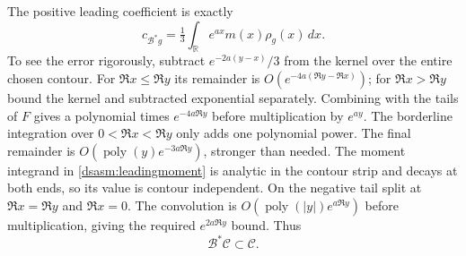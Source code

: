 \documentclass[11pt,letterpaper]{article}
\theoremstyle{remark}\newtheorem{remark}[theorem]{Remark}
\newcommand{\R}{\mathbb R}\newcommand{\C}{\mathbb C}\newcommand{\N}{\mathbb N}
\begin{document}
The positive leading coefficient is exactly
\begin{equation}\label{dsasm:leadingmoment}
 c_{\mathcal B^*g}=\tfrac13\int_\R e^{ax}m(x)\rho_g(x)\,dx.
\end{equation}
To see the error rigorously, subtract $e^{-2a(y-x)}/3$ from the
kernel over the entire chosen contour. For $\Re x\le\Re y$ its
remainder is $O(e^{-4a(\Re y-\Re x)})$; for $\Re x>\Re y$
bound the kernel and subtracted exponential separately. Combining
with the tails of $F$ gives a polynomial times $e^{-4a\Re y}$
before multiplication by $e^{ay}$. The borderline integration over
$0<\Re x<\Re y$ only adds one polynomial power. The final remainder
is $O(\operatorname{poly}(y)e^{-3a\Re y})$, stronger than needed.
The moment integrand in \eqref{dsasm:leadingmoment} is analytic in the
contour strip and decays at both ends, so its value is contour
independent. On the negative tail split at $\Re x=\Re y$ and
$\Re x=0$. The convolution is
$O(\operatorname{poly}(|y|)e^{a\Re y})$ before multiplication,
giving the required $e^{2a\Re y}$ bound. Thus
\begin{equation}\label{dsasm:classclosure}
 \mathcal B^*\mathcal C\subset\mathcal C.
\end{equation}
\end{document}
